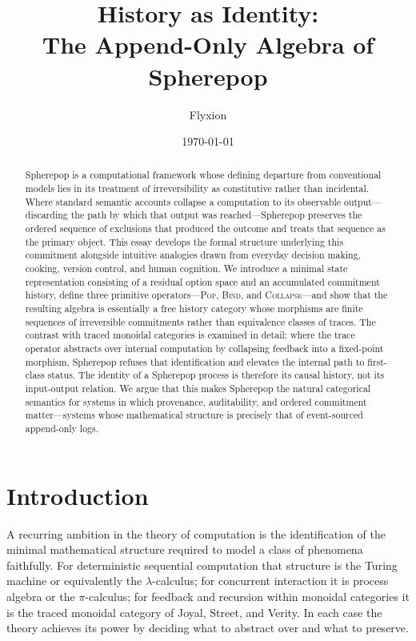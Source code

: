 \documentclass[12pt]{article}
\title{History as Identity:\\
The Append-Only Algebra of Spherepop}
\author{Flyxion}
\date{\today}
\begin{document}
\maketitle

\begin{abstract}
Spherepop is a computational framework whose defining departure from conventional models lies in its treatment of irreversibility as constitutive rather than incidental. Where standard semantic accounts collapse a computation to its observable output---discarding the path by which that output was reached---Spherepop preserves the ordered sequence of exclusions that produced the outcome and treats that sequence as the primary object. This essay develops the formal structure underlying this commitment alongside intuitive analogies drawn from everyday decision making, cooking, version control, and human cognition. We introduce a minimal state representation consisting of a residual option space and an accumulated commitment history, define three primitive operators---\textsc{Pop}, \textsc{Bind}, and \textsc{Collapse}---and show that the resulting algebra is essentially a free history category whose morphisms are finite sequences of irreversible commitments rather than equivalence classes of traces. The contrast with traced monoidal categories is examined in detail: where the trace operator abstracts over internal computation by collapsing feedback into a fixed-point morphism, Spherepop refuses that identification and elevates the internal path to first-class status. The identity of a Spherepop process is therefore its causal history, not its input-output relation. We argue that this makes Spherepop the natural categorical semantics for systems in which provenance, auditability, and ordered commitment matter---systems whose mathematical structure is precisely that of event-sourced append-only logs.
\end{abstract}

\newpage
\tableofcontents
\newpage

\section{Introduction}

A recurring ambition in the theory of computation is the identification of the minimal mathematical structure required to model a class of phenomena faithfully. For deterministic sequential computation that structure is the Turing machine or equivalently the $\lambda$-calculus; for concurrent interaction it is process algebra or the $\pi$-calculus; for feedback and recursion within monoidal categories it is the traced monoidal category of Joyal, Street, and Verity. In each case the theory achieves its power by deciding what to abstract over and what to preserve.
\end{document}
